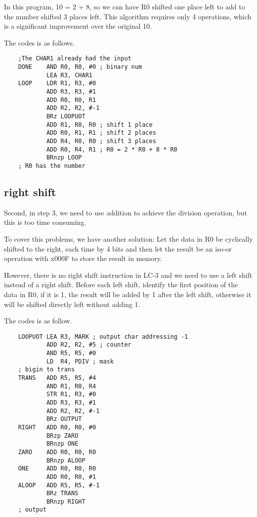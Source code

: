 \documentclass[20pt]{ctexart}
\begin{document}
In this program, 10 = 2 + 8, so we can have R0 shifted one place left to add to the number shifted 3 places left. This algorithm requires only 4 operations, which is a significant improvement over the original 10.

The codes is as follows.
\begin{verbatim}
    ;The CHAR1 already had the input
    DONE    AND R0, R0, #0 ; binary num
            LEA R3, CHAR1
    LOOP    LDR R1, R3, #0
            ADD R3, R3, #1
            ADD R0, R0, R1
            ADD R2, R2, #-1
            BRz LOOPUOT
            ADD R1, R0, R0 ; shift 1 place
            ADD R0, R1, R1 ; shift 2 places
            ADD R4, R0, R0 ; shift 3 places
            ADD R0, R4, R1 ; R0 = 2 * R0 + 8 * R0
            BRnzp LOOP
    ; R0 has the number
\end{verbatim}

\subsection{right shift}
Second, in step 3, we need to use addition to achieve the division operation, but this is too time consuming.

To cover this problems, we have another solution: Let the data in R0 be cyclically shifted to the right, each time by 4 bits and then let the result be an iso-or operation with x000F to store the result in memory.

However, there is no right shift instruction in LC-3 and we need to use a left shift instead of a right shift. Before each left shift, identify the first position of the data in R0, if it is 1, the result will be added by 1 after the left shift, otherwise it will be shifted directly left without adding 1.

The codes is as follow.

\begin{verbatim}
    LOOPUOT LEA R3, MARK ; output char addressing -1
            ADD R2, R2, #5 ; counter
            AND R5, R5, #0
            LD  R4, PDIV ; mask
    ; bigin to trans
    TRANS   ADD R5, R5, #4
            AND R1, R0, R4
            STR R1, R3, #0
            ADD R3, R3, #1
            ADD R2, R2, #-1
            BRz OUTPUT
    RIGHT   ADD R0, R0, #0
            BRzp ZARO
            BRnzp ONE
    ZARO    ADD R0, R0, R0
            BRnzp ALOOP
    ONE     ADD R0, R0, R0
            ADD R0, R0, #1
    ALOOP   ADD R5, R5, #-1
            BRz TRANS
            BRnzp RIGHT
    ; output
\end{verbatim}
\end{document}
